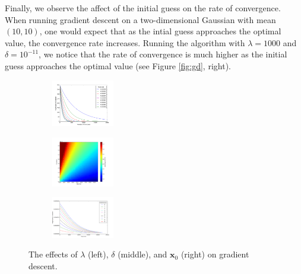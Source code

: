 \documentclass[10pt]{paper}
\begin{document}
Finally, we observe the affect of the initial guess on the rate of convergence. When running gradient descent on a two-dimensional Gaussian with mean $(10, 10)$, one would expect that as the intial guess approaches the optimal value, the convergence rate increases. Running the algorithm with $\lambda = 1000$ and $\delta = 10^{-11}$, we notice that the rate of convergence is much higher as the initial guess approaches the optimal value (see Figure \ref{fig:gd}, right).

\begin{figure}[ht!]
  \label{fig:gd}
  \centering
  \begin{subfigure}
    \centering
      \includegraphics[width=0.3\textwidth]{../images/quadratic_steps_vs_mag}
  \end{subfigure}
  \begin{subfigure}
    \centering
      \includegraphics[width=0.3\textwidth]{../images/lsq_error_gradient}
  \end{subfigure}
   \begin{subfigure}
    \centering
      \includegraphics[width=0.3\textwidth]{../images/guess_vs_mags_2}
  \end{subfigure}
  \caption{The effects of $\lambda$ (left), $\delta$ (middle), and $\mathbf{x}_0$ (right) on gradient descent.}
\end{figure}
\end{document}
